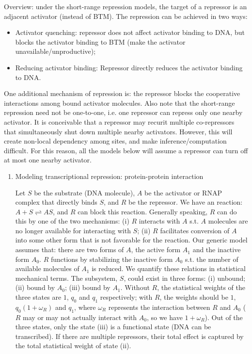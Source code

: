 \documentclass[11pt]{article}
\begin{document}
\begin{enumerate}
Overview: under the short-range repression models, the target of a repressor is an adjacent activator (instead of BTM). The repression can be achieved in two ways: 
\begin{itemize}
\item Activator quenching: repressor does not affect activator binding to DNA, but blocks the activator binding to BTM (make the activator unavailable/unproductive); 
\item Reducing activator binding: Repressor directly reduces the activator binding to DNA. 
\end{itemize}
One additional mechanism of repression is: the repressor blocks the cooperative interactions among bound activator molecules. Also note that the short-range repression need not be one-to-one, i.e. one repressor can repress only one nearby activator. It is conceivable that a repressor may recurit multiple co-repressors that simultaneously shut down multiple nearby activators. However, this will create non-local dependency among sites, and make inference/computation difficult. For this reason, all the models below will assume a repressor can turn off at most one nearby activator. 

\begin{enumerate}

\item{Modeling transcriptional repression: protein-protein interaction}

Let $S$ be the substrate (DNA molecule), $A$ be the activator or RNAP complex that directly binds $S$, and $R$ be the repressor. We have an reaction: $A + S \rightleftharpoons AS$, and $R$ can block this reaction. Generally speaking, $R$ can do this by one of the two mechanisms: (i) $R$ interacts with $A$ s.t. $A$ molecules are no longer available for interacting with $S$; (ii) $R$ facilitates conversion of $A$ into some other form that is not favorable for the reaction. Our generic model assumes that: there are two forms of $A$, the active form $A_1$ and the inactive form $A_0$. $R$ functions by stabilizing the inactive form $A_0$ s.t. the number of available molecules of $A_1$ is reduced. We quantify these relations in statistical mechanical terms. The subsystem, $S$, could exist in three forms: (i) unbound; (ii) bound by $A_0$; (iii) bound by $A_1$. Without $R$, the statistical weights of the three states are $1$, $q_0$ and $q_1$ respectively; with $R$, the weights should be $1$, $q_0 (1 + \omega_R)$ and $q_1$, where $\omega_R$ represents the interaction between $R$ and $A_0$ ($R$ may or may not actually interact with $A_0$, so we have $1 + \omega_R$). Out of the three states, only the state (iii) is a functional state (DNA can be transcribed). If there are multiple repressors, their total effect is captured by the total statistical weight of state (ii). 


\end{enumerate}
\end{enumerate}
\end{document}

